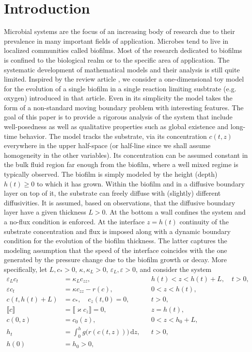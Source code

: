 \documentclass[reqno,11pt]{amsart}
\numberwithin{equation}{section}
\newcommand{\rd}{\mathrm{d}}
\begin{document}
\section{Introduction}
Microbial systems are the focus of an increasing body of research due
to their prevalence in many important fields of application.  Microbes
tend to live in localized communities called biofilms. Most of the
research dedicated to biofilms is confined to the biological realm or
to the specific area of application. The systematic development of
mathematical models and their analysis is still quite
limited. Inspired by the review article \cite{KD10}, we consider a
one-dimensional toy model for the evolution of a single biofilm in a
single reaction limiting susbtrate (e.g. oxygen) introduced in
that article. Even in its simplicity the model takes the form of a
non-standard moving boundary problem with interesting features. The
goal of this paper is to provide a rigorous analysis of the system
that include well-posedness as well as qualitative properties such as
global existence and long-time behavior. The model tracks the
substrate, via its concentration $c(t,z)$ everywhere in the upper
half-space (or half-line since we shall assume homogeneity in the
other variables). Its concentration can be assumed constant in the
bulk fluid region far enough from the biofilm, where a well mixed
regime is typically observed. The biofilm is simply modeled by the
height (depth) $h(t)\geq 0$ to which it has grown. Within the biofilm and in a
diffusive boundary layer on top of it, the substrate can freely
diffuse with (slightly) different diffusivities. It is assumed, based
on observations, that the diffusive boundary layer have a given thickness
$L>0$. At the bottom a wall confines the system and a no-flux
condition is enforced. At the interface $z=h(t)$ continuity of the
substrate concentration and flux is imposed along with a dynamic
boundary condition for the evolution of the biofilm thickness. The
latter captures the modeling assumption that the speed of the
interface coincides with the one generated by the pressure change due
to the biofilm growth or decay. More specifically, let $L,c_*>0$,
$\kappa,\kappa_L>0$, $\varepsilon_L,\varepsilon>0$, and consider the
system
\begin{subequations}\label{Bx}
\begin{align}
\varepsilon_L  c_t&=\kappa_Lc_{zz}, &&h(t)<z<h(t)+L,\quad t>0,\label{BB1x}\\
\varepsilon c_t&=\kappa c_{zz}-r(c),  &&0<z<h(t),\\
c(t,h(t)+L)&=c_*,\quad c_z(t,0)=0, &&t>0,\label{BB3x}\\
\llbracket c\rrbracket&=\llbracket \varkappa c_z\rrbracket=0, &&z=h(t),\label{BB4x}\\
c(0,z)&=c_0(z),\: &&0<z<h_0+L, \label{BB5x}\\
h_t&=\int_0^h g\big(r(c(t,z))\big)\,\rd z,&& t>0, \label{BB6x}\\
h(0)&=h_0>0 \label{BB7x},
\end{align}
\end{subequations}
\end{document}
